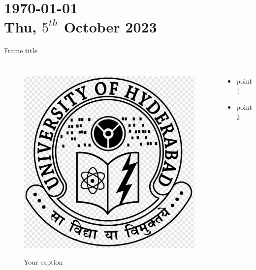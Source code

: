\documentclass[10pt,xcolor=dvipsnames]{beamer}
\begin{document}



\section[Section label]{\small{\today} \\ Thu, $5^{th}$ October 2023  }


     \begin{frame}[fragile]{Frame title}
      \begin{columns}
        \begin{figure}
          \centering
          \includegraphics[width=1\textwidth]{uoh_logo.png}
          \label{plot label}
          \caption{Your caption}
        \end{figure}
        \begin{itemize}
          \raggedright 
          \small
          \item {point 1}
          \item {point 2}
        \end{itemize}
      \end{columns}
    \end{frame}
\end{document}
